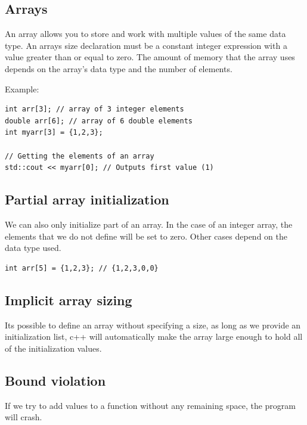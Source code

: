\documentclass{report}
\begin{document}
    \subsection{Arrays}
    \bigbreak \noindent 
    \begin{concept}
 An array allows you to store and work with multiple values of the same data type. An arrays size declaration must be a constant integer expression with a value greater than or equal to zero. The amount of memory that the array uses depends on the array's data type and the number of elements.
	\end{concept}
    \bigbreak \noindent 
    Example:
    \bigbreak \noindent 
    \sepline
    \begin{verbatim}
int arr[3]; // array of 3 integer elements
double arr[6]; // array of 6 double elements
int myarr[3] = {1,2,3};

// Getting the elements of an array
std::cout << myarr[0]; // Outputs first value (1)
    \end{verbatim}
    \sepline
    \bigbreak \noindent 
    \bigbreak \noindent 

   \bigbreak \noindent 
   \subsection{Partial array initialization}
   \bigbreak \noindent 
   We can also only initialize part of an array. In the case of an integer array, the elements that we do not define will be set to zero. Other cases depend on the data type used.
   \bigbreak \noindent 
   \sepline
   \begin{verbatim}
int arr[5] = {1,2,3}; // {1,2,3,0,0}
   \end{verbatim}
   \sepline

   \bigbreak \noindent 
   \subsection{Implicit array sizing}
   \bigbreak \noindent 
   Its possible to define an array without specifying a size, as long as we provide an initialization list, c++ will automatically make the array large enough to hold all of the initialization values.

   \bigbreak \noindent 
   \subsection{Bound violation}
   \bigbreak \noindent 
   If we try to add values to a function without any remaining space, the program will crash.
\end{document}
